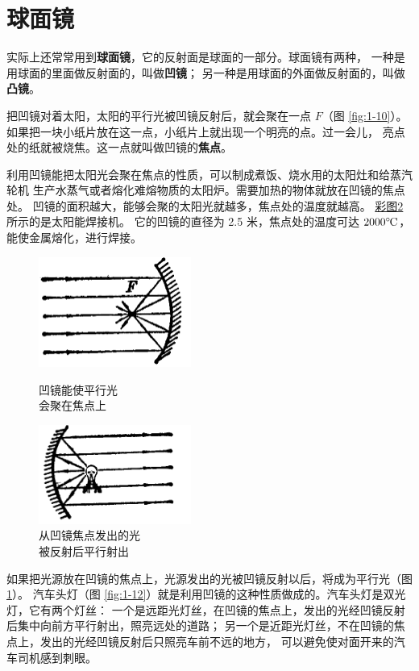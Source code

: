 \section{球面镜}\label{sec:1-4}

实际上还常常用到\textbf{球面镜}，它的反射面是球面的一部分。球面镜有两种，
  一种是用球面的里面做反射面的，叫做\textbf{凹镜}；
另一种是用球面的外面做反射面的，叫做\textbf{凸镜}。

把凹镜对着太阳，太阳的平行光被凹镜反射后，就会聚在一点 $F$（图 \ref{fig:1-10}）。
如果把一块小纸片放在这一点，小纸片上就出现一个明亮的点。过一会儿，
亮点处的纸就被烧焦。这一点就叫做凹镜的\textbf{焦点}。

利用凹镜能把太阳光会聚在焦点的性质，可以制成煮饭、烧水用的太阳灶和给蒸汽轮机
生产水蒸气或者熔化难熔物质的太阳炉。需要加热的物体就放在凹镜的焦点处。
凹镜的面积越大，能够会聚的太阳光就越多，焦点处的温度就越高。
\hyperref[fig:pic2]{彩图2} 所示的是太阳能焊接机。
它的凹镜的直径为 2.5 米，焦点处的温度可达 $2000\celsius$，能使金属熔化，进行焊接。

\begin{figure}[htbp]
    \centering
    \begin{minipage}{7cm}
    \centering
    \includegraphics[width=5cm]{../pic/czwl2-ch1-10}
    \caption{凹镜能使平行光\\会聚在焦点上}\label{fig:1-10}
    \end{minipage}
    \qquad
    \begin{minipage}{7cm}
    \centering
    \includegraphics[width=5cm]{../pic/czwl2-ch1-11}
    \caption{从凹镜焦点发出的光\\被反射后平行射出}\label{fig:1-11}
    \end{minipage}
\end{figure}


如果把光源放在凹镜的焦点上，光源发出的光被凹镜反射以后，将成为平行光（图 \ref{fig:1-11}）。
汽车头灯（图 \ref{fig:1-12}）就是利用凹镜的这种性质做成的。汽车头灯是双光灯，它有两个灯丝：
一个是远距光灯丝，在凹镜的焦点上，发出的光经凹镜反射后集中向前方平行射出，照亮远处的道路；
另一个是近距光灯丝，不在凹镜的焦点上，发出的光经凹镜反射后只照亮车前不远的地方，
可以避免使对面开来的汽车司机感到刺眼。


